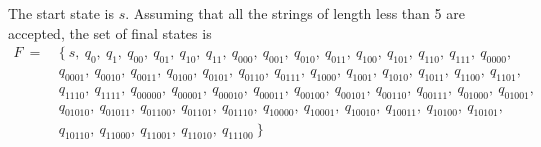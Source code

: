 \documentclass{article}
\begin{document}
    The start state is $s$. Assuming that all the strings of length less than 5 are accepted, the set of final states is 
    \begin{equation}
    \begin{aligned}
    F~  = ~&\{\  s,~  q_{0},~  q_{1},~  q_{00},~  q_{01},~  q_{10},~
      q_{11},~  q_{000},~  q_{001},~  q_{010},~  q_{011},~  q_{100},~  q_{101},~  q_{110},~  q_{111},~  q_{0000},~ \\
      & q_{0001},~  q_{0010},~  q_{0011},~  q_{0100},~  q_{0101},~q_{0110},~  q_{0111},~  q_{1000},~  q_{1001},~  q_{1010},~  q_{1011},~  q_{1100},~  q_{1101},~ \\
      &  q_{1110},~  q_{1111},~  q_{00000},~  q_{00001},~  q_{00010},~  q_{00011},~q_{00100},~  q_{00101},~  q_{00110},~  q_{00111},~  q_{01000},~  q_{01001},~ \\
      & q_{01010},~  q_{01011},~   q_{01100},~  q_{01101},~  q_{01110},~  q_{10000},~  q_{10001},~q_{10010},~  q_{10011},~  q_{10100},~  q_{10101},~\\
      &  q_{10110},~  q_{11000},~  q_{11001},~ q_{11010},~  q_{11100}\ \} \nonumber
    \end{aligned}
    \end{equation}
    
\end{document}
